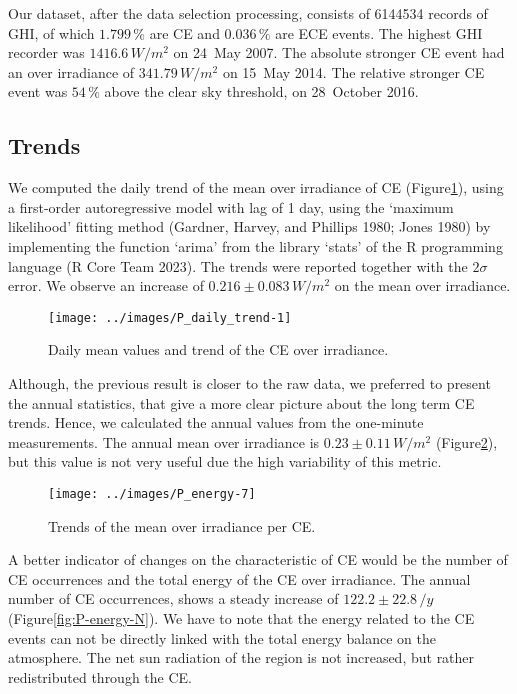\documentclass[
]{article}
\begin{document}
Our dataset, after the data selection processing, consists of
6144534 records of GHI, of which
\(1.799\,\%\) are CE and
\(0.036\,\%\) are ECE events.
The highest GHI recorder was
\(1416.6\,W/m^2\)
on 24~May 2007.
The absolute stronger CE event had an over irradiance of
\(341.79\,W/m^2\) on
15~May 2014.
The relative stronger CE event was
\(54\,\%\) above the
clear sky threshold, on
28~October 2016.

\hypertarget{trends}{%
\subsection{Trends}\label{trends}}

We computed the daily trend of the mean over irradiance of CE
(Figure\nobreakspace{}\ref{fig:CEmeanDaily}), using a first-order autoregressive
model with lag of 1 day, using the `maximum likelihood' fitting method (Gardner, Harvey, and Phillips 1980; Jones 1980) by implementing the function `arima' from the library `stats' of the R
programming language (R Core Team 2023). The trends were reported together with the \(2\sigma\)
error. We observe an increase of
\(0.216\pm 0.083\,W/m^2\)
on the mean over irradiance.

\begin{figure}[h!]

{\centering \texttt{[image: ../images/P\_daily\_trend-1]} 

}

\caption{Daily mean values and trend of the CE over irradiance.}\label{fig:CEmeanDaily}
\end{figure}

Although, the previous result is closer to the raw data, we preferred to present the
annual statistics, that give a more clear picture about the long term CE trends.
Hence, we calculated the annual values from the one-minute measurements.
The annual mean over irradiance is
\(0.23\pm 0.11\,W/m^2\)
(Figure\nobreakspace{}\ref{fig:P-energy-mean}),
but this value is not very useful due the high
variability of this metric.

\begin{figure}[h!]

{\centering \texttt{[image: ../images/P\_energy-7]} 

}

\caption{Trends of the mean over irradiance per CE.}\label{fig:P-energy-mean}
\end{figure}

A better indicator of changes on the characteristic of CE would be the number of CE
occurrences and the total energy of the CE over irradiance. The annual number of CE
occurrences, shows a steady increase of
\(122.2\pm 22.8\,/y\)
(Figure\nobreakspace{}\ref{fig:P-energy-N}).
We have to note that the energy related to the CE events can not be directly linked
with the total energy balance on the atmosphere. The net sun radiation of the region
is not increased, but rather redistributed through the CE.
\end{document}
